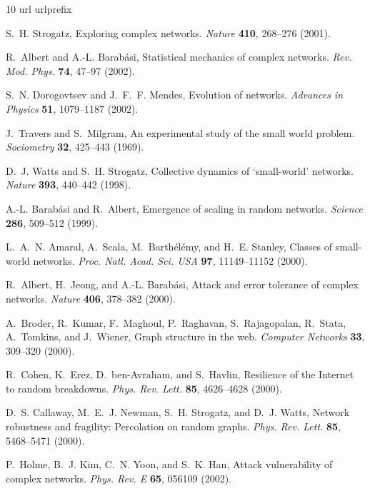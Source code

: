 \documentclass[twocolumn,pre]{revtex4}
\begin{document}
\begin{thebibliography}{10}
\expandafter\ifx\csname url\endcsname\relax
  \def\url#1{\texttt{#1}}\fi
\expandafter\ifx\csname urlprefix\endcsname\relax\def\urlprefix{URL }\fi

S.~H. Strogatz, Exploring complex networks. \textit{Nature} \textbf{410},
  268--276 (2001).

R.~Albert and A.-L. Barab\'asi, Statistical mechanics of complex networks.
  \textit{Rev. Mod. Phys.} \textbf{74}, 47--97 (2002).

S.~N. Dorogovtsev and J.~F.~F. Mendes, Evolution of networks. \textit{Advances
  in Physics} \textbf{51}, 1079--1187 (2002).

J.~Travers and S.~Milgram, An experimental study of the small world problem.
  \textit{Sociometry} \textbf{32}, 425--443 (1969).

D.~J. Watts and S.~H. Strogatz, Collective dynamics of `small-world' networks.
  \textit{Nature} \textbf{393}, 440--442 (1998).

A.-L. Barab\'asi and R.~Albert, Emergence of scaling in random networks.
  \textit{Science} \textbf{286}, 509--512 (1999).

L.~A.~N. Amaral, A.~Scala, M.~Barth\'el\'emy, and H.~E. Stanley, Classes of
  small-world networks. \textit{Proc. Natl. Acad. Sci. USA} \textbf{97},
  11149--11152 (2000).

R.~Albert, H.~Jeong, and A.-L. Barab\'asi, Attack and error tolerance of
  complex networks. \textit{Nature} \textbf{406}, 378--382 (2000).

A.~Broder, R.~Kumar, F.~Maghoul, P.~Raghavan, S.~Rajagopalan, R.~Stata,
  A.~Tomkins, and J.~Wiener, Graph structure in the web. \textit{Computer
  Networks} \textbf{33}, 309--320 (2000).

R.~Cohen, K.~Erez, D.~{ben-Avraham}, and S.~Havlin, Resilience of the
  {I}nternet to random breakdowns. \textit{Phys. Rev. Lett.} \textbf{85},
  4626--4628 (2000).

D.~S. Callaway, M.~E.~J. Newman, S.~H. Strogatz, and D.~J. Watts, Network
  robustness and fragility: Percolation on random graphs. \textit{Phys. Rev.
  Lett.} \textbf{85}, 5468--5471 (2000).

P.~Holme, B.~J. Kim, C.~N. Yoon, and S.~K. Han, Attack vulnerability of complex
  networks. \textit{Phys. Rev. E} \textbf{65}, 056109 (2002).


\end{thebibliography}
\end{document}
